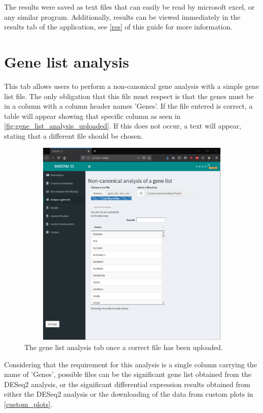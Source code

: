 \documentclass[11pt]{article}
\begin{document}
The results were saved as text files that can easily be read by microsoft excel, or any similar program.
Additionally, results can be viewed immediately in the results tab of the application, see \autoref{res} of this guide for more information.


\section{Gene list analysis \label{gene_list_analysis}}
This tab allows users to perform a non-canonical gene analysis with a simple gene list file. The only obligation that this file must respect is that the genes must be in a column with a column header names 'Genes'. If the file entered is correct, a table will appear showing that specific column as seen in \autoref{fig:gene_list_analysis_uploaded}. If this does not occur, a text will appear, stating that a different file should be chosen.
\begin{figure}[h!]
\centering
\includegraphics[width=15cm,height=10cm,keepaspectratio]{gene_list_analysis.png}
\caption{The gene list analysis tab once a correct file has been uploaded.}
\label{fig:gene_list_analysis_uploaded}
\end{figure}

Considering that the requirement for this analysis is a single column carrying the name of 'Genes', possible files can be the significant gene list obtained from the DESeq2 analysis, or the significant differential expression results obtained from either the DESeq2 analysis or the downloading of the data from custom plots in \autoref{custom_plots}.
\end{document}

